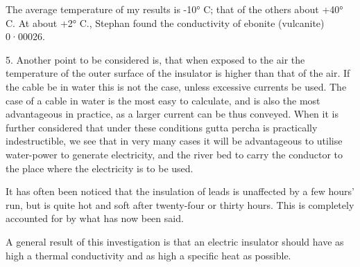 \documentclass[12pt,oneside]{book}[2021/10/04]
\begin{document}
The average temperature of my results is -10° C; that of
the others about +40° C\@. At about +2° C., Stephan found the
conductivity of ebonite (vulcanite) 0·00026.

5. Another point to be considered is, that when exposed to
the air the temperature of the outer surface of the insulator is
higher than that of the air. If the cable be in water this is not
the case, unless excessive currents be used. The case of a cable
in water is the most easy to calculate, and is also the most advantageous
in practice, as a larger current can be thus conveyed.
When it is further considered that under these conditions gutta
percha is practically indestructible, we see that in very many
cases it will be advantageous to utilise water-power to generate
electricity, and the river bed to carry the conductor to the place
where the electricity is to be used.

It has often been noticed that the insulation of leads is
unaffected by a few hours' run, but is quite hot and soft after
twenty-four or thirty hours. This is completely accounted for by
what has now been said.

A general result of this investigation is that an electric insulator
should have as high a thermal conductivity and as high a
specific heat as possible.
\end{document}
